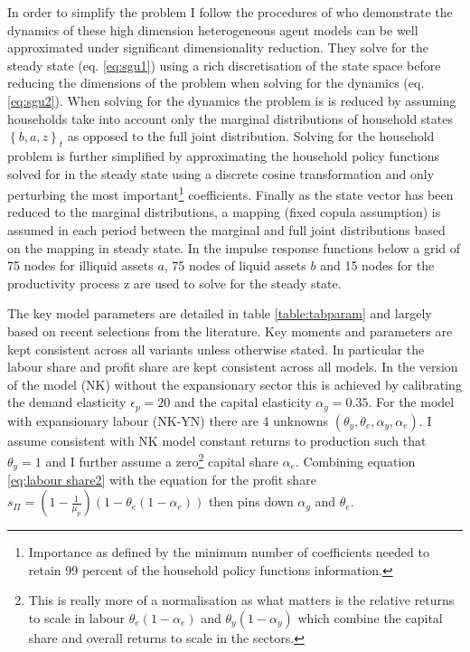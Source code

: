 \documentclass[12pt]{article}
\begin{document}
In order to simplify the problem I follow the procedures of \cite{bayer2020solving} who demonstrate the dynamics of these high dimension heterogeneous agent models can be well approximated under significant dimensionality reduction. They solve for the steady state (eq. \ref{eq:sgu1}) using a rich discretisation of the state space before reducing the dimensions of the problem when solving for the dynamics (eq. \ref{eq:sgu2}). When solving for the dynamics the problem is is reduced by assuming households take into account only the marginal distributions of household states $\left\{b,a,z\right\}_{t}$ as opposed to the full joint distribution. Solving for the household problem is further simplified by approximating the household policy functions solved for in the steady state using a discrete cosine transformation and only perturbing the most important\footnote{Importance as defined by the minimum number of coefficients needed to retain 99 percent of the household policy functions information.} coefficients. Finally as the state vector has been reduced to the marginal distributions, a mapping (fixed copula assumption) is assumed in each period between the marginal and full joint distributions based on the mapping in steady state. In the impulse response functions below a grid of 75 nodes for illiquid assets $a$, 75 nodes of liquid assets $b$ and 15 nodes for the productivity process z are used to solve for the steady state. 

The key model parameters are detailed in table \ref{table:tabparam} and largely based on recent selections from the literature. Key moments and parameters are kept consistent across all variants unless otherwise stated. In particular the labour share and profit share are kept consistent across all models. In the version of the model (NK) without the expansionary sector this is achieved by calibrating the demand elasticity $\epsilon_p=20$ and the capital elasticity $\alpha_y=0.35$. For the model with expansionary labour (NK-YN) there are 4 unknowns $(\theta_y, \theta_e,\alpha_y,\alpha_e)$. I assume consistent with NK model constant returns to production such that $\theta_y=1$ and I further assume a zero\footnote{This is really more of a normalisation as what matters is the relative returns to scale in labour $\theta_{e}(1-\alpha_{e})$ and $\theta_{y}(1-\alpha_{y})$ which combine the capital share and overall returns to scale in the sectors.} capital share $\alpha_e$. Combining equation \ref{eq:labour share2} with the equation for the profit share $s_{\Pi}=(1-\frac{1}{\mu_p})(1-\theta_{e}(1-\alpha_e))$ then pins down $\alpha_y$ and $\theta_e$.       
\end{document}
